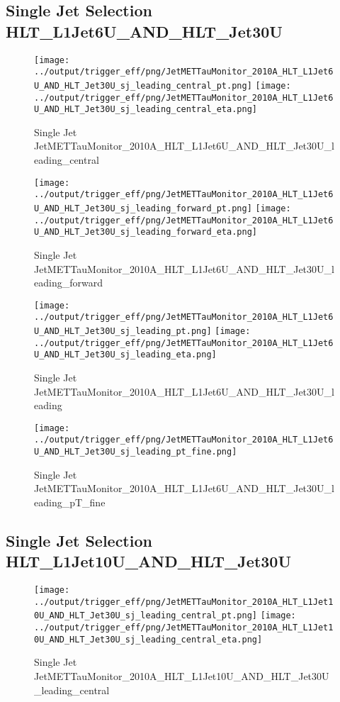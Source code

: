 \documentclass[11pt]{article}
\begin{document}
\newpage
\subsection{Single Jet Selection HLT\_L1Jet6U\_AND\_HLT\_Jet30U}
\begin{figure}[ht]
\centering
\texttt{[image: ../output/trigger\_eff/png/JetMETTauMonitor\_2010A\_HLT\_L1Jet6U\_AND\_HLT\_Jet30U\_sj\_leading\_central\_pt.png]}
\texttt{[image: ../output/trigger\_eff/png/JetMETTauMonitor\_2010A\_HLT\_L1Jet6U\_AND\_HLT\_Jet30U\_sj\_leading\_central\_eta.png]}
\caption{Single Jet JetMETTauMonitor\_2010A\_HLT\_L1Jet6U\_AND\_HLT\_Jet30U\_leading\_central}
\label{fig:jetmettaumon_sj_HLT_L1Jet6U_AND_HLT_Jet30U_leading_central}
\end{figure}

\begin{figure}[ht]
\centering
\texttt{[image: ../output/trigger\_eff/png/JetMETTauMonitor\_2010A\_HLT\_L1Jet6U\_AND\_HLT\_Jet30U\_sj\_leading\_forward\_pt.png]}
\texttt{[image: ../output/trigger\_eff/png/JetMETTauMonitor\_2010A\_HLT\_L1Jet6U\_AND\_HLT\_Jet30U\_sj\_leading\_forward\_eta.png]}
\caption{Single Jet JetMETTauMonitor\_2010A\_HLT\_L1Jet6U\_AND\_HLT\_Jet30U\_leading\_forward}
\label{fig:jetmettaumon_sj_HLT_L1Jet6U_AND_HLT_Jet30U_leading_forward}
\end{figure}

\begin{figure}[ht]
\centering
\texttt{[image: ../output/trigger\_eff/png/JetMETTauMonitor\_2010A\_HLT\_L1Jet6U\_AND\_HLT\_Jet30U\_sj\_leading\_pt.png]}
\texttt{[image: ../output/trigger\_eff/png/JetMETTauMonitor\_2010A\_HLT\_L1Jet6U\_AND\_HLT\_Jet30U\_sj\_leading\_eta.png]}
\caption{Single Jet JetMETTauMonitor\_2010A\_HLT\_L1Jet6U\_AND\_HLT\_Jet30U\_leading}
\label{fig:jetmettaumon_sj_HLT_L1Jet6U_AND_HLT_Jet30U_leading}
\end{figure}

\begin{figure}[ht]
\centering
\texttt{[image: ../output/trigger\_eff/png/JetMETTauMonitor\_2010A\_HLT\_L1Jet6U\_AND\_HLT\_Jet30U\_sj\_leading\_pt\_fine.png]}
\caption{Single Jet JetMETTauMonitor\_2010A\_HLT\_L1Jet6U\_AND\_HLT\_Jet30U\_leading\_pT\_fine}
\label{fig:jetmettaumon_sj_HLT_L1Jet6U_AND_HLT_Jet30U_leading_pT_fine}
\end{figure}
\clearpage


\newpage
\subsection{Single Jet Selection HLT\_L1Jet10U\_AND\_HLT\_Jet30U}
\begin{figure}[ht]
\centering
\texttt{[image: ../output/trigger\_eff/png/JetMETTauMonitor\_2010A\_HLT\_L1Jet10U\_AND\_HLT\_Jet30U\_sj\_leading\_central\_pt.png]}
\texttt{[image: ../output/trigger\_eff/png/JetMETTauMonitor\_2010A\_HLT\_L1Jet10U\_AND\_HLT\_Jet30U\_sj\_leading\_central\_eta.png]}
\caption{Single Jet JetMETTauMonitor\_2010A\_HLT\_L1Jet10U\_AND\_HLT\_Jet30U\_leading\_central}
\label{fig:jetmettaumon_sj_HLT_L1Jet10U_AND_HLT_Jet30U_leading_central}
\end{figure}
\end{document}
